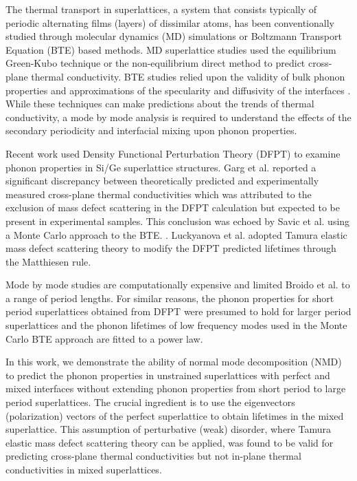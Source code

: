\documentclass[aps,prb,preprint,preprintnumbers,amsmath,amssymb,floatfix,superscriptaddress]{revtex4}
\begin{document}
The thermal transport in superlattices, a system that consists typically of periodic alternating films (layers) of dissimilar atoms, has been conventionally studied through molecular dynamics (MD) simulations or Boltzmann Transport Equation (BTE) based methods. MD superlattice studies used the equilibrium  Green-Kubo\cite {PhysRevB.85.195302} technique or the non-equilibrium \cite{PhysRevB.79.214307,PhysRevB.79.075316,PhysRevB.72.174302} direct method to predict cross-plane thermal conductivity. BTE studies relied upon the validity of bulk phonon properties\cite{walkauskas:2579,chen:220} and approximations of the specularity and diffusivity of the interfaces \cite {PhysRevB.57.14958}. While these techniques can make predictions about the trends of thermal conductivity, a mode by mode analysis is required to understand the effects of the secondary periodicity and interfacial mixing upon phonon properties. 

Recent work used Density Functional Perturbation Theory (DFPT) to examine phonon properties in Si/Ge superlattice structures. Garg et al. reported a significant discrepancy between theoretically predicted and experimentally measured cross-plane thermal conductivities which was attributed to the exclusion of mass defect scattering in the DFPT calculation but expected to be present in experimental samples. \cite{doi:10.1021/nl202186y} This conclusion was echoed by Savic et al. using a Monte Carlo approach to the BTE. \cite{savic:073113}. Luckyanova et al. \cite{Luckyanova16112012} adopted Tamura elastic mass defect scattering theory \cite{tamura_isotope_1983} to modify the DFPT predicted lifetimes through the Matthiesen rule.

Mode by mode studies are computationally expensive and limited Broido et al. to a range of period lengths.\cite {PhysRevB.70.081310} For similar reasons, the phonon properties for short period superlattices obtained from DFPT were presumed to hold for larger period superlattices \cite{Luckyanova16112012, doi:10.1021/nl202186y} and the phonon lifetimes of low frequency modes used in the Monte Carlo BTE approach are fitted to a power law. \cite{savic:073113}

In this work, we demonstrate the ability of normal mode decomposition (NMD) to predict the phonon properties in unstrained superlattices with perfect and mixed interfaces without extending phonon properties from short period to large period superlattices. The crucial ingredient is to use the eigenvectors (polarization) vectors of the perfect superlattice to obtain lifetimes in the mixed superlattice. This assumption of perturbative (weak) disorder, where Tamura elastic mass defect scattering theory can be applied, was found to be valid for predicting cross-plane thermal conductivities but not in-plane thermal conductivities in mixed superlattices. 
\end{document}
